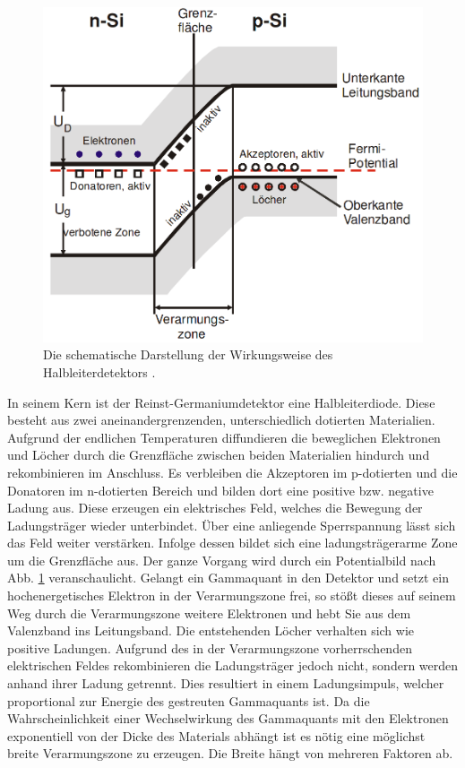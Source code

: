 \begin{figure}
	\centering
	\includegraphics[width=\linewidth-100pt,height=\textheight-100pt,keepaspectratio]{content/Images/detek.png}
    \caption{Die schematische Darstellung der Wirkungsweise des Halbleiterdetektors \cite{V18}.}
    \label{fig:POTENTIAL}
\end{figure}

In seinem Kern ist der Reinst-Germaniumdetektor eine Halbleiterdiode. Diese besteht aus zwei aneinandergrenzenden, unterschiedlich dotierten Materialien. Aufgrund der endlichen Temperaturen diffundieren die beweglichen Elektronen und Löcher durch die Grenzfläche zwischen beiden Materialien hindurch und rekombinieren im Anschluss. Es verbleiben die Akzeptoren im p-dotierten und die Donatoren im n-dotierten Bereich und bilden dort eine positive bzw. negative Ladung aus. Diese erzeugen ein elektrisches Feld, welches die Bewegung der Ladungsträger wieder unterbindet. Über eine anliegende Sperrspannung lässt sich das Feld weiter verstärken. Infolge dessen bildet sich eine ladungsträgerarme Zone um die Grenzfläche aus. Der ganze Vorgang wird durch ein Potentialbild nach Abb. \ref{fig:POTENTIAL} veranschaulicht. Gelangt ein Gammaquant in den Detektor und setzt ein hochenergetisches Elektron in der Verarmungszone frei, so stößt dieses auf seinem Weg durch die Verarmungszone weitere Elektronen und hebt Sie aus dem Valenzband ins Leitungsband. Die entstehenden Löcher verhalten sich wie positive Ladungen. Aufgrund des in der Verarmungszone vorherrschenden elektrischen Feldes rekombinieren die Ladungsträger jedoch nicht, sondern werden anhand ihrer Ladung getrennt. Dies resultiert in einem Ladungsimpuls, welcher proportional zur Energie des gestreuten Gammaquants ist. %
Da die Wahrscheinlichkeit einer Wechselwirkung des Gammaquants mit den Elektronen exponentiell von der Dicke des Materials abhängt ist es nötig eine möglichst breite Verarmungszone zu erzeugen. Die Breite hängt von mehreren Faktoren ab.

